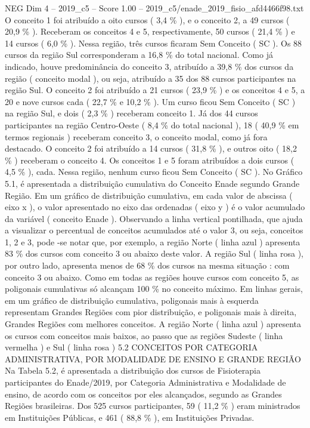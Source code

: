 \begin{textsample}{NEG Dim 4 – 2019\_c5 – Score 1.00 – 2019\_c5/enade\_2019\_fisio\_afd4466f98.txt}
O conceito 1 foi atribuído a oito cursos ( 3,4 \% ), e o conceito 2, a 49 cursos ( 20,9 \% ).
Receberam os conceitos 4 e 5, respectivamente, 50 cursos ( 21,4 \% ) e 14 cursos ( 6,0 \% ).
Nessa região, três cursos ficaram Sem Conceito ( SC ).
Os 88 cursos da região Sul corresponderam a 16,8 \% do total nacional.
Como já indicado, houve predominância do conceito 3, atribuído a 39,8 \% dos cursos da região ( conceito modal ), ou seja, atribuído a 35 dos 88 cursos participantes na região Sul.
O conceito 2 foi atribuído a 21 cursos ( 23,9 \% ) e os conceitos 4 e 5, a 20 e nove cursos cada ( 22,7 \% e 10,2 \% ).
Um curso ficou Sem Conceito ( SC ) na região Sul, e dois ( 2,3 \% ) receberam conceito 1.
Já dos 44 cursos participantes na região Centro-Oeste ( 8,4 \% do total nacional ), 18 ( 40,9 \% em termos regionais ) receberam conceito 3, o conceito modal, como já fora destacado.
O conceito 2 foi atribuído a 14 cursos ( 31,8 \% ), e outros oito ( 18,2 \% ) receberam o conceito 4.
Os conceitos 1 e 5 foram atribuídos a dois cursos ( 4,5 \% ), cada.
Nessa região, nenhum curso ficou Sem Conceito ( SC ).
No Gráfico 5.1, é apresentada a distribuição cumulativa do Conceito Enade segundo Grande Região.
Em um gráfico de distribuição cumulativa, em cada valor de abscissa ( eixo x ), o valor apresentado no eixo das ordenadas ( eixo y ) é o valor acumulado da variável ( conceito Enade ).
Observando a linha vertical pontilhada, que ajuda a visualizar o percentual de conceitos acumulados até o valor 3, ou seja, conceitos 1, 2 e 3, pode -se notar que, por exemplo, a região Norte ( linha azul ) apresenta 83 \% dos cursos com conceito 3 ou abaixo deste valor.
A região Sul ( linha rosa ), por outro lado, apresenta menos de 68 \% dos cursos na mesma situação : com conceito 3 ou abaixo.
Como em todas as regiões houve cursos com conceito 5, as poligonais cumulativas só alcançam 100 \% no conceito máximo.
Em linhas gerais, em um gráfico de distribuição cumulativa, poligonais mais à esquerda representam Grandes Regiões com pior distribuição, e poligonais mais à direita, Grandes Regiões com melhores conceitos.
A região Norte ( linha azul ) apresenta os cursos com conceitos mais baixos, ao passo que as regiões Sudeste ( linha vermelha ) e Sul ( linha rosa ) 5.2 CONCEITOS POR CATEGORIA ADMINISTRATIVA, POR MODALIDADE DE ENSINO E GRANDE REGIÃO Na Tabela 5.2, é apresentada a distribuição dos cursos de Fisioterapia participantes do Enade/2019, por Categoria Administrativa e Modalidade de ensino, de acordo com os conceitos por eles alcançados, segundo as Grandes Regiões brasileiras.
Dos 525 cursos participantes, 59 ( 11,2 \% ) eram ministrados em Instituições Públicas, e 461 ( 88,8 \% ), em Instituições Privadas.

\end{textsample}
